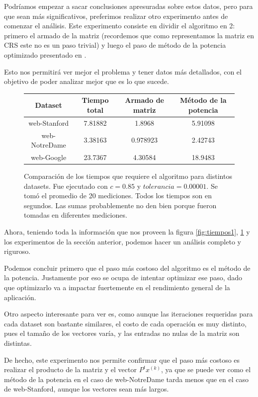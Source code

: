 Podríamos empezar a sacar conclusiones apresuradas sobre estos datos, pero para que sean más significativos, preferimos realizar otro experimento antes de comenzar el análisis.
Este experimento consiste en dividir el algoritmo en 2: primero el armado de la matriz (recordemos que como representamos la matriz en CRS este no es un paso trivial) y luego el paso de método de la potencia optimizado presentado en \cite{Kamvar2003}.

Esto nos permitirá ver mejor el problema y tener datos más detallados, con el objetivo de poder analizar mejor que es lo que sucede.

\begin{figure}[H]
\centering
\begin{tabular}{| c | c | c | c |}
  \hline
  Dataset & Tiempo total & Armado de matriz & Método de la potencia \\ \hline \hline
  web-Stanford & 7.81882 & 1.8968 & 5.91098 \\ \hline
  web-NotreDame &  3.38163 & 0.978923 & 2.42743 \\ \hline
  web-Google & 23.7367 & 4.30584 & 18.9483 \\ \hline
\end{tabular}

  \caption{\footnotesize{Comparación de los tiempos que requiere el algoritmo para distintos datasets. Fue ejecutado con $c = 0.85$ y $tolerancia = 0.00001$. Se tomó el promedio de 20 mediciones. Todos los tiempos son en segundos. Las sumas probablemente no den bien porque fueron tomadas en diferentes mediciones. }}
  \label{fig:tiempos2}
\end{figure}


Ahora, teniendo toda la información que nos proveen la figura \ref{fig:tiempos1}, \ref{fig:tiempos2} y los experimentos de la sección anterior, podemos hacer un análisis completo y riguroso.

Podemos concluir primero que el paso más costoso del algoritmo es el método de la potencia. Justamente por eso \cite{Kamvar2003} se ocupa de intentar optimizar ese paso, dado que optimizarlo va a impactar fuertemente en el rendimiento general de la aplicación.


Otro aspecto interesante para ver es, como aunque las iteraciones requeridas para cada dataset son bastante similares, el costo de cada operación es muy distinto, pues el tamaño de los vectores varía, y las entradas no nulas de la matriz son distintas. 

De hecho, este experimento nos permite confirmar que el paso más costoso es realizar el producto de la matriz y el vector $P^t x^{(k)}$, ya que se puede ver como el método de la potencia en el caso de web-NotreDame tarda menos que en el caso de web-Stanford, aunque los vectores sean más largos. 

